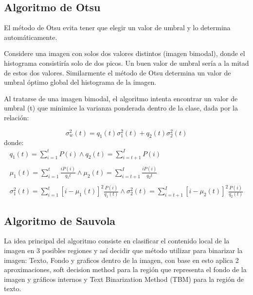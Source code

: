 \subsection{Algoritmo de Otsu}
El método de Otsu evita tener que elegir un valor de umbral y lo determina automáticamente.

Considere una imagen con solos dos valores distintos (imagen bimodal), donde el histograma consistiría solo de dos picos. Un buen valor de umbral sería a la mitad de estos dos valores. Similarmente el método de Otsu determina un valor de umbral óptimo global del histograma de la imagen.

Al tratarse de una imagen bimodal, el algoritmo intenta encontrar un valor de umbral (t) que minimice la varianza ponderada dentro de la clase, dada por la relación:

\begin{equation}
	\sigma _ {w} ^{2}(t) = q_{1}(t) \sigma _{1}^2(t) + q_{2}(t) \sigma _{2}^2(t)
\end{equation}
donde:
\begin{equation}
	\begin{array}{l}
		q_{1}(t) = \sum_{i=1}^{t} P(i) \wedge q_{2}(t) = \sum_{i=t+1}^{I} P(i)\\\\
		\mu_{1}(t) = \sum_{i=1}^{t} \frac{i P(i)}{q_1{t}} \wedge \mu_{2}(t) = \sum_{i=t+1}^{I} \frac{i P(i)}{q_2{t}}\\\\
		\sigma_{1}^2(t) = \sum_{i = 1}^{t} [i - \mu_{1}(t)]^2 \frac{P(i)}{q_{1}(t)} \wedge \sigma_{2}^2(t) = \sum_{i = t+1}^{I} [i - \mu_{2}(t)]^2 \frac{P(i)}{q_{2}(t)}
	\end{array}
\end{equation}



\subsection{Algoritmo de Sauvola}

La idea principal del algoritmo consiste en clasificar el contenido local de la imagen en 3 posibles regiones y así decidir que método utilizar para binarizar la imagen: Texto, Fondo y graficos dentro de la imagen, con base en esto aplica 2 aproximaciones, soft decision method para la región que representa el fondo de la imagen y gráficos internos y Text Binarization Method (TBM) para la región de texto.

